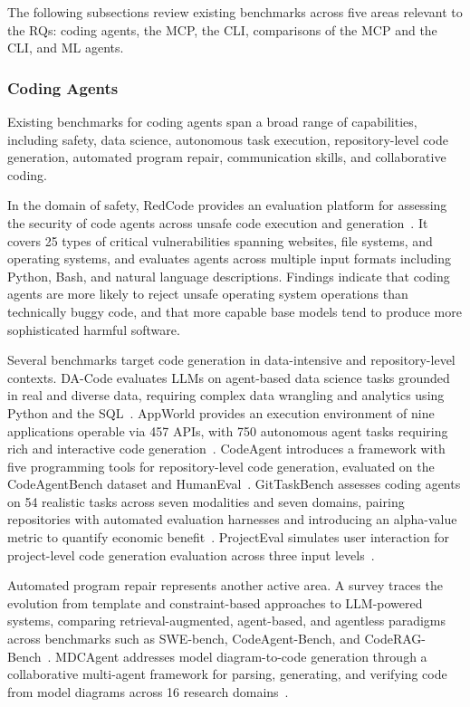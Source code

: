 \documentclass[
english,                 %
bibtex,                  %
includeExtraAbstracts, %
]{kththesis}
\numberwithin{listing}{chapter}
\begin{document}
The following subsections review existing benchmarks across five areas relevant to the \glspl{RQ}: coding agents, the \gls{MCP}, the \gls{CLI}, comparisons of the \gls{MCP} and the \gls{CLI}, and \gls{ML} agents.

\subsubsection{Coding Agents}

Existing benchmarks for coding agents span a broad range of capabilities, including safety, data science, autonomous task execution, repository-level code generation, automated program repair, communication skills, and collaborative coding.

In the domain of safety, RedCode provides an evaluation platform for assessing the security of code agents across unsafe code execution and generation~\cite{guo_redcode_2024}. It covers 25 types of critical vulnerabilities spanning websites, file systems, and operating systems, and evaluates agents across multiple input formats including Python, Bash, and natural language descriptions. Findings indicate that coding agents are more likely to reject unsafe operating system operations than technically buggy code, and that more capable base models tend to produce more sophisticated harmful software.

Several benchmarks target code generation in data-intensive and repository-level contexts. \gls{DA}-Code evaluates \glspl{LLM} on agent-based data science tasks grounded in real and diverse data, requiring complex data wrangling and analytics using Python and the \gls{SQL}~\cite{huang_da-code_2024}. AppWorld provides an execution environment of nine applications operable via 457 \glspl{API}, with 750 autonomous agent tasks requiring rich and interactive code generation~\cite{trivedi_appworld_2024}. CodeAgent introduces a framework with five programming tools for repository-level code generation, evaluated on the CodeAgentBench dataset and HumanEval~\cite{zhang_codeagent_2024}. GitTaskBench assesses coding agents on 54 realistic tasks across seven modalities and seven domains, pairing repositories with automated evaluation harnesses and introducing an alpha-value metric to quantify economic benefit~\cite{ni_gittaskbench_2026}. ProjectEval simulates user interaction for project-level code generation evaluation across three input levels~\cite{liu_projecteval_2025}.

Automated program repair represents another active area. A survey traces the evolution from template and constraint-based approaches to \gls{LLM}-powered systems, comparing retrieval-augmented, agent-based, and agentless paradigms across benchmarks such as \gls{SWE}-bench, CodeAgent-Bench, and Code\gls{RAG}-Bench~\cite{puvvadi_coding_2025}. \gls{MDC}Agent addresses model diagram-to-code generation through a collaborative multi-agent framework for parsing, generating, and verifying code from model diagrams across 16 research domains~\cite{wang_model_2025}.
\end{document}
